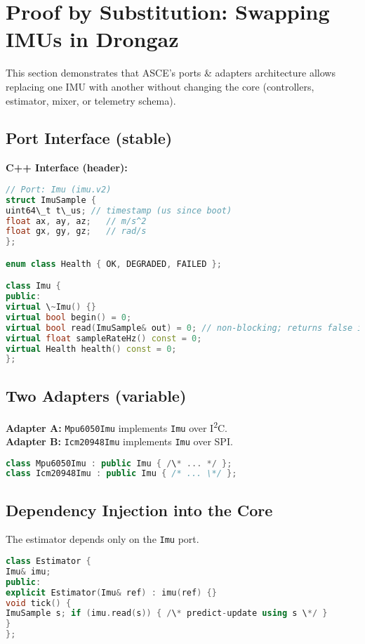 \section{Proof by Substitution: Swapping IMUs in Drongaz}\label{sec:proof-substitution-imu}
This section demonstrates that ASCE's ports \& adapters architecture allows replacing one IMU with another without changing the core (controllers, estimator, mixer, or telemetry schema).

\subsection{Port Interface (stable)}
\noindent\textbf{C++ Interface (header):}
\begin{lstlisting}[language=C++]
// Port: Imu (imu.v2)
struct ImuSample {
uint64\_t t\_us; // timestamp (us since boot)
float ax, ay, az;   // m/s^2
float gx, gy, gz;   // rad/s
};

enum class Health { OK, DEGRADED, FAILED };

class Imu {
public:
virtual \~Imu() {}
virtual bool begin() = 0;
virtual bool read(ImuSample& out) = 0; // non-blocking; returns false if no new sample
virtual float sampleRateHz() const = 0;
virtual Health health() const = 0;
};
\end{lstlisting}

\subsection{Two Adapters (variable)}
\noindent\textbf{Adapter A:} \texttt{Mpu6050Imu} implements \texttt{Imu} over I\textsuperscript{2}C.\\
\textbf{Adapter B:} \texttt{Icm20948Imu} implements \texttt{Imu} over SPI.

\begin{lstlisting}[language=C++]
class Mpu6050Imu : public Imu { /\* ... */ };
class Icm20948Imu : public Imu { /* ... \*/ };
\end{lstlisting}

\subsection{Dependency Injection into the Core}
The estimator depends only on the \texttt{Imu} port.
\begin{lstlisting}[language=C++]
class Estimator {
Imu& imu;
public:
explicit Estimator(Imu& ref) : imu(ref) {}
void tick() {
ImuSample s; if (imu.read(s)) { /\* predict-update using s \*/ }
}
};
\end{lstlisting}

